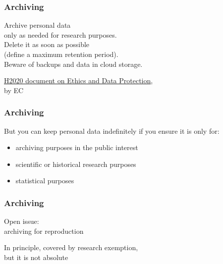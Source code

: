 \documentclass[17pt,aspectratio=169,hyperref={pdfusetitle,colorlinks,allcolors=olive}]{beamer}
\begin{document}
\begin{frame}[fragile]
  \frametitle{Archiving}

  Archive personal data \\
  only as needed for research purposes. \\
  \vspace{.3cm}
  Delete it as soon as possible \\
  (define a maximum retention period). \\
  \vspace{.3cm}
  Beware of backups and data in cloud storage.
  
  {\footnotesize
    \begin{flushright}
    \href{https://ec.europa.eu/research/participants/data/ref/h2020/grants_manual/hi/ethics/h2020_hi_ethics-data-protection_en.pdf}{H2020 document on Ethics and Data Protection}, \\ by EC
  \end{flushright}
  }
\end{frame}

\begin{frame}[fragile]
  \frametitle{Archiving}

But you can keep personal data indefinitely if you ensure it is only for:

\begin{itemize}
\item archiving purposes in the public interest
\item scientific or historical research purposes
\item statistical purposes
\end{itemize}

\end{frame}

\begin{frame}[fragile]
  \frametitle{Archiving}

  \begin{center}
    {\Large
      Open issue: \\
      archiving for reproduction \\
    }
  \end{center}

  \vspace{.5cm}
  In principle, covered by research exemption, \\
    but it is not absolute\\
    
\end{frame}
\end{document}
